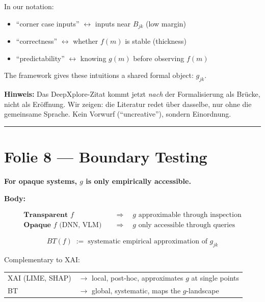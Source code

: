 \documentclass[11pt, a4paper]{article}
\newcommand{\actiontitle}[1]{{\Large\bfseries\color{tumdark} #1}\par\vspace{0.3em}}
\newcommand{\slidenote}[1]{{\small\color{accent}\textbf{Hinweis:} #1}\par}
\begin{document}
In our notation:
\begin{itemize}[nosep]
\item ``corner case inputs'' $\longleftrightarrow$ inputs near $B_{jk}$ (low margin)
\item ``correctness'' $\longleftrightarrow$ whether $f(m)$ is stable (thickness)
\item ``predictability'' $\longleftrightarrow$ knowing $g(m)$ before observing $f(m)$
\end{itemize}

The framework gives these intuitions a shared formal object: $g_{jk}$.

\slidenote{Das DeepXplore-Zitat kommt jetzt \emph{nach} der Formalisierung als Br\"ucke, nicht als Er\"offnung. Wir zeigen: die Literatur redet \"uber dasselbe, nur ohne die gemeinsame Sprache. Kein Vorwurf (``uncreative''), sondern Einordnung.}

\bigskip\hrule\bigskip

\section*{Folie 8 --- Boundary Testing}

\actiontitle{For opaque systems, $g$ is only empirically accessible.}

\textbf{Body:}

\begin{align}
\textbf{Transparent } f &\quad \Rightarrow \quad g \text{ approximable through inspection} \\
\textbf{Opaque } f \text{ (DNN, VLM)} &\quad \Rightarrow \quad g \text{ only accessible through queries}
\end{align}

\begin{tcolorbox}[colframe=accent, colback=white]
\begin{equation}
BT(f) \;:=\; \text{systematic empirical approximation of } g_{jk}
\end{equation}
\end{tcolorbox}

Complementary to XAI:
\begin{center}
\begin{tabular}{ll}
XAI (LIME, SHAP) & $\to$ local, post-hoc, approximates $g$ at single points \\
BT & $\to$ global, systematic, maps the $g$-landscape \\
\end{tabular}
\end{center}
\end{document}
